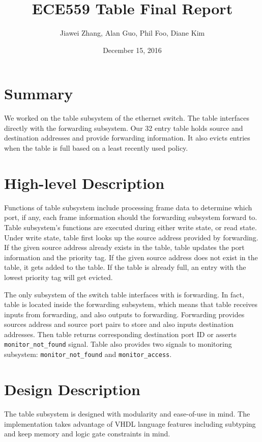 \documentclass{article}
\title{ECE559 Table Final Report}
\author{Jiawei Zhang, Alan Guo, Phil Foo, Diane Kim }
\date{December 15, 2016}
\begin{document}
\maketitle

\section{Summary}

We worked on the table subsystem of the ethernet switch. The table interfaces directly with the forwarding subsystem. Our 32 entry table holds source and destination addresses and provide forwarding information. It also evicts entries when the table is full based on a least recently used policy.

\section{High-level Description}

Functions of table subsystem include processing frame data to determine which port, if any, each frame information should the forwarding subsystem forward to. Table subsystem’s functions are executed during either write state, or read state. Under write state, table first looks up the source address provided by forwarding. If the given source address already exists in the table, table updates the port information and the priority tag. If the given source address does not exist in the table, it gets added to the table. If the table is already full, an entry with the lowest priority tag will get evicted.

The only subsystem of the switch table interfaces with is forwarding. In fact, table is located inside the forwarding subsystem, which means that table receives inputs from forwarding, and also outputs to forwarding. Forwarding provides sources address and source port pairs to store and also inputs destination addresses. Then table returns corresponding destination port ID or asserts \texttt{monitor\_not\_found} signal. Table also provides two signals to monitoring subsystem: \texttt{monitor\_not\_found} and \texttt{monitor\_access}.



\newpage

\section{Design Description}

The table subsystem is designed with modularity and ease-of-use in mind. The implementation takes advantage of VHDL language features including subtyping and keep memory and logic gate constraints in mind. 
\end{document}
